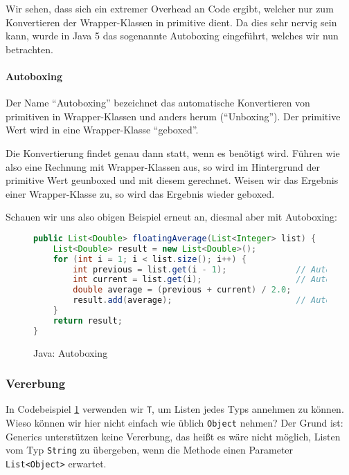 		Wir sehen, dass sich ein extremer Overhead an Code ergibt, welcher nur zum Konvertieren der Wrapper-Klassen in primitive dient. Da dies sehr nervig sein kann, wurde in Java 5 das sogenannte Autoboxing eingeführt, welches wir nun betrachten.
	
		\paragraph{Autoboxing}
			Der Name \enquote{Autoboxing} bezeichnet das automatische Konvertieren von primitiven in Wrapper-Klassen und anders herum (\enquote{Unboxing}). Der primitive Wert wird in eine Wrapper-Klasse \enquote{geboxed}.
			
			Die Konvertierung findet genau dann statt, wenn es benötigt wird. Führen wie also eine Rechnung mit Wrapper-Klassen aus, so wird im Hintergrund der primitive Wert geunboxed und mit diesem gerechnet. Weisen wir das Ergebnis einer Wrapper-Klasse zu, so wird das Ergebnis wieder geboxed.
			
			
			Schauen wir uns also obigen Beispiel erneut an, diesmal aber mit Autoboxing:
			\begin{figure}[H]
				\centering
				\begin{lstlisting}[language = Java]
public List<Double> floatingAverage(List<Integer> list) {
	List<Double> result = new List<Double>();
	for (int i = 1; i < list.size(); i++) {
		int previous = list.get(i - 1);              // Autounboxing
		int current = list.get(i);                   // Autounboxing
		double average = (previous + current) / 2.0;
		result.add(average);                         // Autoboxing
	}
	return result;
}
				\end{lstlisting}
				\caption{Java: Autoboxing}
				\label{fig:java_generics_motivation_gen}
			\end{figure}
	
	\subsubsection{Vererbung}
		In Codebeispiel \ref{fig:java_generics_motivation_gen} verwenden wir \texttt{T}, um Listen jedes Typs annehmen zu können. Wieso können wir hier nicht einfach wie üblich \texttt{Object} nehmen? Der Grund ist: Generics unterstützen keine Vererbung, das heißt es wäre nicht möglich, Listen vom Typ \texttt{String} zu übergeben, wenn die Methode einen Parameter \texttt{List<Object>} erwartet.
		
